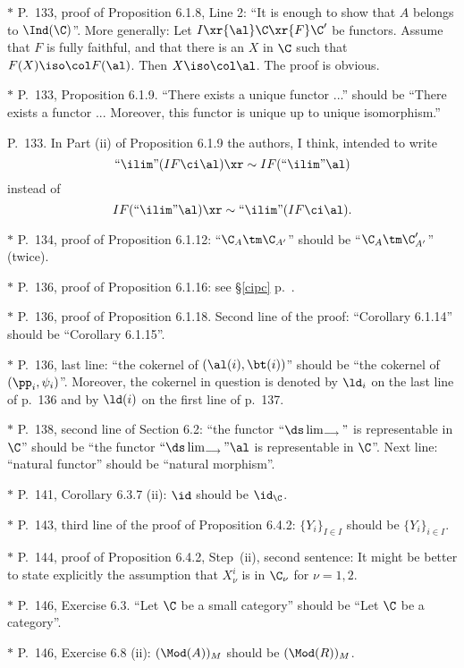 \documentclass[12pt]{article}
\theoremstyle{remark}
\theoremstyle{definition}
\begin{document}
\nn$*$ P.~133, proof of Proposition 6.1.8, Line 2: ``It is enough to show that $A$ belongs to $\Ind(\C)$''. More generally: Let $I\xr{\al}\C\xr{F}\C'$ be functors. Assume that $F$ is fully faithful, and that there is an $X$ in $\C$ such that $F(X)\iso\col F(\al)$. Then $X\iso\col\al$. The proof is obvious.

\nn$*$ P.~133, Proposition 6.1.9. ``There exists a unique functor ...'' should be ``There exists a functor ... Moreover, this functor is unique up to unique isomorphism.''

\begin{s} 
P.~133. In Part (ii) of Proposition 6.1.9 the authors, I think, intended to write 
$$
``\ilim"(IF\ci\al)\xr\sim IF(``\ilim"\al)
$$
instead of 
$$
IF(``\ilim"\al)\xr\sim``\ilim"(IF\ci\al). 
$$ 
\end{s}

\nn$*$ P.~134, proof of Proposition 6.1.12: ``$\C_A\tm\C_{A'}$'' should be ``$\C_A\tm\C'_{A'}$'' (twice).

\nn$*$ P.~136, proof of Proposition 6.1.16: see \S\ref{cipc} p.~.

\nn$*$ P.~136, proof of Proposition 6.1.18. Second line of the proof: ``Corollary 6.1.14'' should be ``Corollary 6.1.15''. 

\nn$*$ P.~136, last line: ``the cokernel of $(\al(i),\bt(i))$'' should be ``the cokernel of $(\pp_i,\psi_i)$''. Moreover, the cokernel in question is denoted by $\ld_i$ on the last line of p.~136 and by $\ld(i)$ on the first line of p.~137.

\nn$*$ P.~138, second line of Section 6.2: ``the functor $``\ds\lim_{\longrightarrow}"$ is representable in $\C$'' should be ``the functor $``\ds\lim_{\longrightarrow}"\al$ is representable in $\C$''. Next line: ``natural functor'' should be ``natural morphism''.

\nn$*$ P.~141, Corollary 6.3.7 (ii): $\id$ should be $\id_\C$.

\nn$*$ P.~143, third line of the proof of Proposition 6.4.2: $\{Y_i\}_{I\in I}$ should be $\{Y_i\}_{i\in I}$.

\nn$*$ P.~144, proof of Proposition 6.4.2, Step~(ii), second sentence: It might be better to state explicitly the assumption that $X_\nu^i$ is in $\C_\nu$ for $\nu=1,2$. 

\nn$*$ P.~146, Exercise 6.3. ``Let $\C$ be a small category'' should be ``Let $\C$ be a category''.

\nn$*$ P.~146, Exercise 6.8 (ii): $(\Mod(A))_M$  should be $(\Mod(R))_M$.
\end{document}
